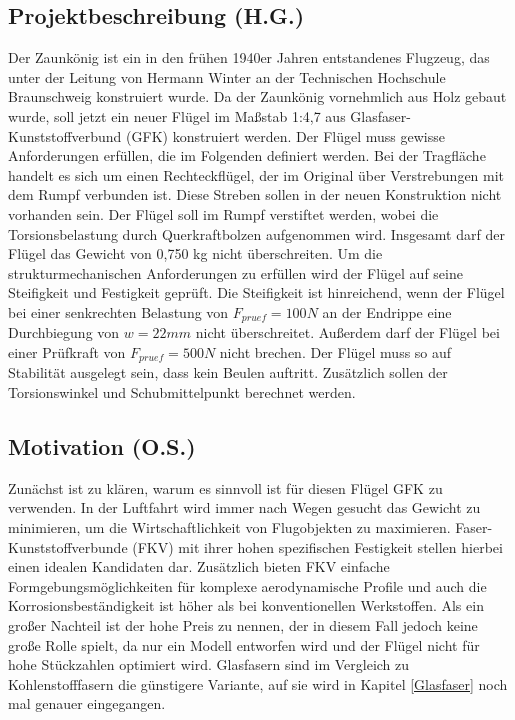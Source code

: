 
\subsection{Projektbeschreibung (H.G.)}
Der Zaunkönig ist ein in den frühen 1940er Jahren entstandenes Flugzeug, das unter der Leitung von Hermann Winter an der Technischen Hochschule Braunschweig konstruiert wurde. Da der Zaunkönig vornehmlich aus Holz gebaut wurde, soll jetzt ein neuer Flügel im Maßstab 1:4,7 aus Glasfaser-Kunststoffverbund (GFK) konstruiert werden. Der Flügel muss gewisse Anforderungen erfüllen, die im Folgenden definiert werden.
Bei der Tragfläche handelt es sich um einen Rechteckflügel, der im Original über Verstrebungen mit dem Rumpf verbunden ist. Diese Streben sollen in der neuen Konstruktion nicht vorhanden sein. Der Flügel soll im Rumpf verstiftet werden, wobei die Torsionsbelastung durch Querkraftbolzen aufgenommen wird. Insgesamt darf der Flügel das Gewicht von 0,750 kg nicht überschreiten.
Um die strukturmechanischen Anforderungen zu erfüllen wird der Flügel auf seine Steifigkeit und Festigkeit geprüft. Die Steifigkeit ist hinreichend, wenn der Flügel bei einer senkrechten Belastung von $ F_{pruef}=100N $ an der Endrippe eine Durchbiegung von $ w=22mm $ nicht überschreitet. Außerdem darf der Flügel bei einer Prüfkraft von $ F_{pruef}=500N $ nicht brechen. Der Flügel muss so auf Stabilität ausgelegt sein, dass kein Beulen auftritt. Zusätzlich sollen der Torsionswinkel und Schubmittelpunkt berechnet werden.
\subsection{Motivation (O.S.)}
Zunächst ist zu klären, warum es sinnvoll ist für diesen Flügel GFK zu verwenden. In der Luftfahrt wird immer nach Wegen gesucht das Gewicht zu minimieren, um die Wirtschaftlichkeit von Flugobjekten zu maximieren. Faser-Kunststoffverbunde (FKV) mit ihrer hohen spezifischen Festigkeit stellen hierbei einen idealen Kandidaten dar. Zusätzlich bieten FKV einfache Formgebungsmöglichkeiten für komplexe aerodynamische Profile und auch die Korrosionsbeständigkeit ist höher als bei konventionellen Werkstoffen. Als ein großer Nachteil ist der hohe Preis zu nennen, der in diesem Fall jedoch keine große Rolle spielt, da nur ein Modell entworfen wird und der Flügel nicht für hohe Stückzahlen optimiert wird. Glasfasern sind im Vergleich zu Kohlenstofffasern die günstigere Variante, auf sie wird in Kapitel \ref{Glasfaser} noch mal genauer eingegangen.
